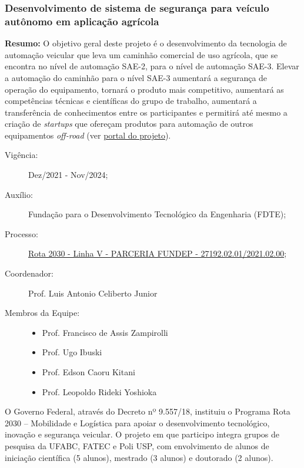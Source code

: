 \subsubsection{Desenvolvimento de sistema de segurança para veículo autônomo em aplicação agrícola}

\noindent\textbf{Resumo:} O objetivo geral deste projeto é o desenvolvimento da tecnologia de automação veicular que leva um caminhão comercial de uso agrícola, que se encontra no nível de automação SAE-2, para o nível de automação SAE-3. Elevar a automação do caminhão para o nível SAE-3 aumentará a segurança de operação do equipamento, tornará o produto mais competitivo, aumentará as competências técnicas e científicas do grupo de trabalho, aumentará a transferência de conhecimentos entre os participantes e permitirá até mesmo a criação de \textit{startups} que ofereçam produtos para automação de outros equipamentos \textit{off-road} (ver \href{https://sites.google.com/view/offroad-autonomous/home?authuser=0}{portal do projeto}).

\begin{description}
    \item[Vigência:] Dez/2021 - Nov/2024;
    \item[Auxílio:] Fundação para o Desenvolvimento Tecnológico da Engenharia (FDTE);
    \item[Processo:] \href{https://pesquisa.in.gov.br/imprensa/servlet/INPDFViewer?jornal=530&pagina=154&data=24/12/2021&captchafield=firstAccess}{Rota 2030 - Linha V - PARCERIA FUNDEP - 27192.02.01/2021.02.00};
    \item[Coordenador:] Prof. Luis Antonio Celiberto Junior 
    \item[Membros da Equipe:] \hfill 
    \begin{itemize}
        \item Prof. Francisco de Assis Zampirolli
        \item Prof. Ugo Ibuski 
        \item Prof. Edson Caoru Kitani 
        \item Prof. Leopoldo Rideki Yoshioka 
    \end{itemize}
\end{description}

O Governo Federal, através do Decreto nº 9.557/18, instituiu o Programa Rota 2030 – Mobilidade e Logística para apoiar o desenvolvimento tecnológico, inovação e segurança veicular. O projeto em que participo integra grupos de pesquisa da UFABC, FATEC e Poli USP, com envolvimento de alunos de iniciação científica (5 alunos), mestrado (3 alunos) e doutorado (2 alunos).

